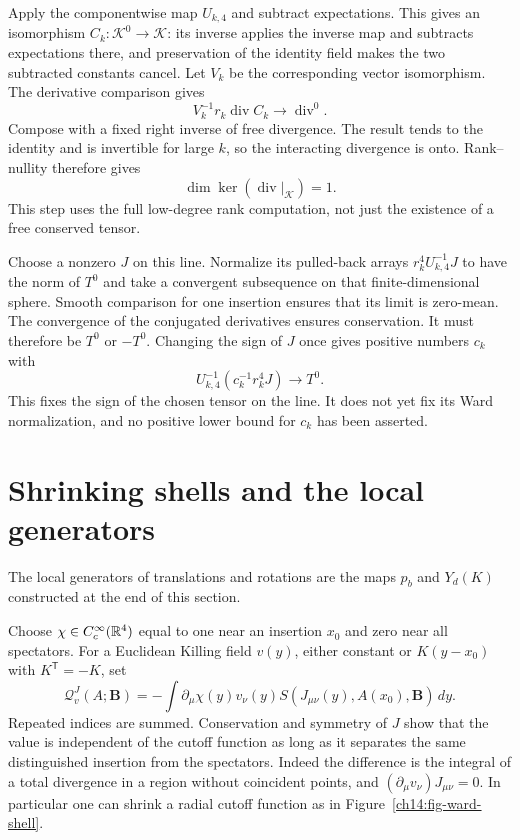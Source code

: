 Apply the componentwise map $U_{k,4}$ and subtract expectations. This gives an
isomorphism $C_k:\mathcal K^0\to\mathcal K$: its inverse applies the inverse map
and subtracts expectations there, and preservation of the identity field makes the two
subtracted constants cancel. Let $V_k$ be the corresponding vector
isomorphism. The derivative comparison gives
\[
       V_k^{-1}r_k\operatorname{div}C_k
                          \longrightarrow\operatorname{div}^0.
\]
Compose with a fixed right inverse of free divergence. The result
tends to the identity and is invertible for large $k$, so the interacting
divergence is onto. Rank--nullity therefore gives
\begin{equation}\label{ch14:conserved-line}
                     \dim\ker(\operatorname{div}|_{\mathcal K})=1.
\end{equation}
This step uses the full low-degree rank computation, not just the
existence of a free conserved tensor.

Choose a nonzero $J$ on this line. Normalize its pulled-back arrays
$r_k^4 U_{k,4}^{-1}J$ to have the norm of $T^0$ and take a convergent
subsequence on that finite-dimensional sphere. Smooth comparison
for one insertion ensures that its limit is zero-mean. The convergence of the conjugated derivatives
ensures conservation. It must therefore be $T^0$ or $-T^0$.
Changing the sign of $J$ once gives positive numbers $c_k$ with
\begin{equation}\label{ch14:balanced-stress}
            U_{k,4}^{-1}(c_k^{-1}r_k^4J)\longrightarrow T^0.
\end{equation}
This fixes the sign of the chosen tensor on the line. It does not yet fix
its Ward normalization, and no positive lower bound for $c_k$ has
been asserted.

\section{Shrinking shells and the local generators}
\label{ch14:shells}

The local generators of translations and rotations are the maps $p_b$ and $Y_d(K)$ constructed at the end of this section.

Choose $\chi\in C_c^\infty(\mathbb R^4)$ equal to one near an insertion
$x_0$ and zero near all spectators. For a Euclidean Killing field
$v(y)$, either constant or $K(y-x_0)$ with $K^{\mathsf T}=-K$, set
\begin{equation}\label{ch14:flux}
 \mathcal Q^J_v(A;\boldsymbol B)
 =-\int\partial_\mu\chi(y)v_\nu(y)
              S(J_{\mu\nu}(y),A(x_0),\boldsymbol B)\,dy.
\end{equation}
Repeated indices are summed. Conservation and symmetry of $J$ show
that the value is independent of the cutoff function as long as it separates
the same distinguished insertion from the spectators. Indeed the
difference is the integral of a total divergence in a
region without coincident points, and $(\partial_\mu v_\nu)J_{\mu\nu}=0$. In particular one
can shrink a radial cutoff function as in Figure~\ref{ch14:fig-ward-shell}.

